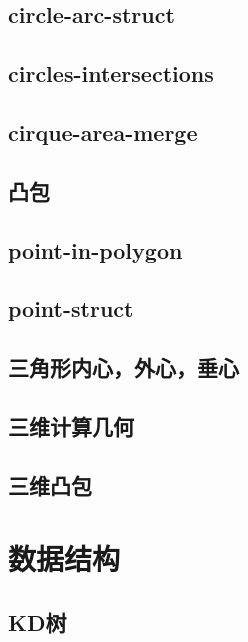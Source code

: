 \documentclass[titlepage,a4paper,10pt]{article}
\begin{document}
\begin{spacing}{0.8}
			\subsection{circle-arc-struct}
				
			\subsection{circles-intersections}
				
			\subsection{cirque-area-merge}
				
			\subsection{凸包}
				
			\subsection{point-in-polygon}
				
			\subsection{point-struct}
				
			\subsection{三角形内心，外心，垂心}
				
			\subsection{三维计算几何}
				
			\subsection{三维凸包}
				
		\section{数据结构}
			\subsection{KD树}
				

\end{spacing}
\end{document}

